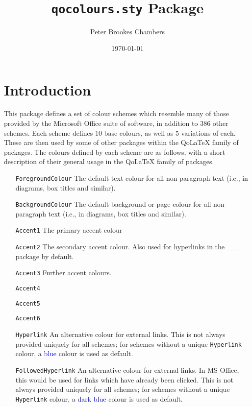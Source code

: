 \documentclass[]{article}
\title{\texttt{qocolours.sty} Package}
\author{Peter Brookes Chambers}
\date{\today{}}
\newcommand{\qo}{Qo\LaTeX}
\begin{document}
\setlength\parskip{1.5em}
\newif\ifcols
\colsfalse
\newif\ifcolstest
\colstesttrue
\setlength\columnsep{2cm}
\setlength{\columnseprule}{0.4pt}

\maketitle
\clearpage

\tableofcontents
\clearpage


  \section{Introduction}
  This package defines a set of colour schemes which resemble many of those provided by the Microsoft Office suite of software, in addition to 386 other schemes. Each scheme defines 10 base colours, as well as 5 variations of each. These are then used by some of other packages within the \qo{} family of packages. The colours defined by each scheme are as follows, with a short description of their general usage in the \qo{} family of packages.

  \begin{itemize}[leftmargin = 1.75in, labelsep = 0.75cm]
    \item [\texttt{ForegroundColour}] The default text colour for all non-paragraph text (i.e., in diagrams, box titles and similar).
    \item [\texttt{BackgroundColour}] The default background or page colour for all non-paragraph text (i.e., in diagrams, box titles and similar).
    \item [\texttt{Accent1}] The primary accent colour
    \item [\texttt{Accent2}] The secondary accent colour. Also used for hyperlinks in the \color{red}\_\_\_\normalcolor{} package by default.
    \item [\texttt{Accent3}] Further accent colours.
    \item [\texttt{Accent4}] %
    \item [\texttt{Accent5}] %
    \item [\texttt{Accent6}] %
    \item[\texttt{Hyperlink}] An alternative colour for external links. This is not always provided uniquely for all schemes; for schemes without a unique \texttt{Hyperlink} colour, a \textcolor[HTML]{0000FF}{blue} colour is used as default.
    \item[\texttt{FollowedHyperlink}] An alternative colour for external links. In MS Office, this would be used for links which have already been clicked. This is not always provided uniquely for all schemes; for schemes without a unique \texttt{Hyperlink} colour, a \textcolor[HTML]{0000AA}{dark blue} colour is used as default.
  \end{itemize}
\end{document}
